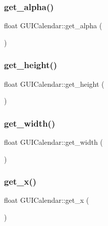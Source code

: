 \subsubsection{\texorpdfstring{get\+\_\+alpha()}{get\_alpha()}}
{\footnotesize\ttfamily float G\+U\+I\+Calendar\+::get\+\_\+alpha (\begin{DoxyParamCaption}{ }\end{DoxyParamCaption})}

\hypertarget{class_g_u_i_calendar_ab62fe827f7ec1df658cca65268fb37c6}{}\label{class_g_u_i_calendar_ab62fe827f7ec1df658cca65268fb37c6} 
\subsubsection{\texorpdfstring{get\+\_\+height()}{get\_height()}}
{\footnotesize\ttfamily float G\+U\+I\+Calendar\+::get\+\_\+height (\begin{DoxyParamCaption}{ }\end{DoxyParamCaption})}

\hypertarget{class_g_u_i_calendar_ad9aa4a60b149bc5e494958a20e10b9b7}{}\label{class_g_u_i_calendar_ad9aa4a60b149bc5e494958a20e10b9b7} 
\subsubsection{\texorpdfstring{get\+\_\+width()}{get\_width()}}
{\footnotesize\ttfamily float G\+U\+I\+Calendar\+::get\+\_\+width (\begin{DoxyParamCaption}{ }\end{DoxyParamCaption})}

\hypertarget{class_g_u_i_calendar_a120b253c9ce3e08af0f5c7a2bd91e617}{}\label{class_g_u_i_calendar_a120b253c9ce3e08af0f5c7a2bd91e617} 
\subsubsection{\texorpdfstring{get\+\_\+x()}{get\_x()}}
{\footnotesize\ttfamily float G\+U\+I\+Calendar\+::get\+\_\+x (\begin{DoxyParamCaption}{ }\end{DoxyParamCaption})}

